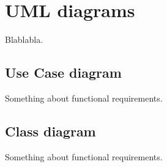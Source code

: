 \chapter{UML diagrams}
Blablabla.

\section{Use Case diagram}
Something about functional requirements.

\section{Class diagram}
Something about functional requirements.
